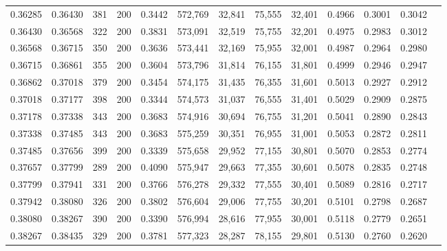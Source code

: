 \begin{tabular}{rrrrrrrrrrrrr}
0.36285 & 0.36430 &    381 & 200 &                                     0.3442 & 572,769 &  32,841 &  75,555 &  32,401 & 0.4966 & 0.3001 & 0.3042 \\
0.36430 & 0.36568 &    322 & 200 &                                     0.3831 & 573,091 &  32,519 &  75,755 &  32,201 & 0.4975 & 0.2983 & 0.3012 \\
0.36568 & 0.36715 &    350 & 200 &                                     0.3636 & 573,441 &  32,169 &  75,955 &  32,001 & 0.4987 & 0.2964 & 0.2980 \\
0.36715 & 0.36861 &    355 & 200 &                                     0.3604 & 573,796 &  31,814 &  76,155 &  31,801 & 0.4999 & 0.2946 & 0.2947 \\
0.36862 & 0.37018 &    379 & 200 &                                     0.3454 & 574,175 &  31,435 &  76,355 &  31,601 & 0.5013 & 0.2927 & 0.2912 \\
0.37018 & 0.37177 &    398 & 200 &                                     0.3344 & 574,573 &  31,037 &  76,555 &  31,401 & 0.5029 & 0.2909 & 0.2875 \\
0.37178 & 0.37338 &    343 & 200 &                                     0.3683 & 574,916 &  30,694 &  76,755 &  31,201 & 0.5041 & 0.2890 & 0.2843 \\
0.37338 & 0.37485 &    343 & 200 &                                     0.3683 & 575,259 &  30,351 &  76,955 &  31,001 & 0.5053 & 0.2872 & 0.2811 \\
0.37485 & 0.37656 &    399 & 200 &                                     0.3339 & 575,658 &  29,952 &  77,155 &  30,801 & 0.5070 & 0.2853 & 0.2774 \\
0.37657 & 0.37799 &    289 & 200 &                                     0.4090 & 575,947 &  29,663 &  77,355 &  30,601 & 0.5078 & 0.2835 & 0.2748 \\
0.37799 & 0.37941 &    331 & 200 &                                     0.3766 & 576,278 &  29,332 &  77,555 &  30,401 & 0.5089 & 0.2816 & 0.2717 \\
0.37942 & 0.38080 &    326 & 200 &                                     0.3802 & 576,604 &  29,006 &  77,755 &  30,201 & 0.5101 & 0.2798 & 0.2687 \\
0.38080 & 0.38267 &    390 & 200 &                                     0.3390 & 576,994 &  28,616 &  77,955 &  30,001 & 0.5118 & 0.2779 & 0.2651 \\
0.38267 & 0.38435 &    329 & 200 &                                     0.3781 & 577,323 &  28,287 &  78,155 &  29,801 & 0.5130 & 0.2760 & 0.2620 \\

\end{tabular}
